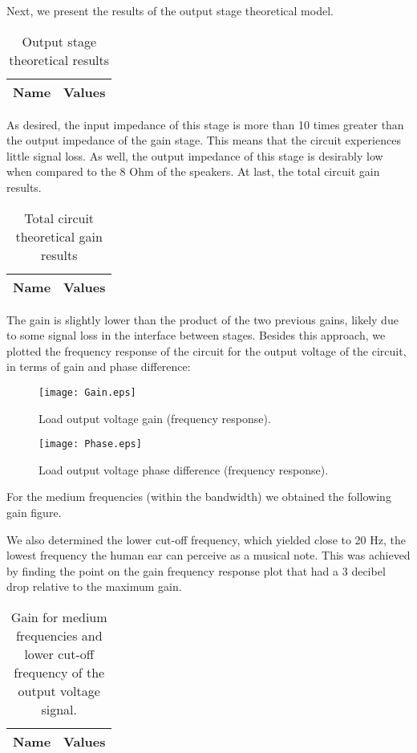 Next, we present the results of the output stage theoretical model.
\begin{table}[h]
  \centering
  \begin{tabular}{|l|r|}
    \hline    
    {\bf Name} & {\bf Values} \\ \hline
     
  \end{tabular}
  \caption{Output stage theoretical results}
  \label{tab:output}
\end{table}
\pagebreak

As desired, the input impedance of this stage is more than 10 times greater than the output impedance of the gain stage. This means that the circuit experiences little signal loss. As well, the output impedance of this stage is desirably low when compared to the 8 Ohm of the speakers.
At last, the total circuit gain results.

\begin{table}[h]
  \centering
  \begin{tabular}{|l|r|}
    \hline    
    {\bf Name} & {\bf Values} \\ \hline
     
  \end{tabular}
  \caption{Total circuit theoretical gain results}
  \label{tab:output}
\end{table}
The gain is slightly lower than the product of the two previous gains, likely due to some signal loss in the interface between stages.
Besides this approach, we plotted the frequency response of the circuit for the output voltage of the circuit, in terms of gain and phase difference:

\begin{figure}[!h] \centering
\texttt{[image: Gain.eps]}
\caption{Load output voltage gain (frequency response).}
\label{fig:gainfreq}
\end{figure}

\begin{figure}[!h] \centering
\texttt{[image: Phase.eps]}
\caption{Load output voltage phase difference (frequency response).}
\label{fig:phasefreq}
\end{figure}

\pagebreak

For the medium frequencies (within the bandwidth) we obtained the following gain figure.

We also determined the lower cut-off frequency, which yielded close to 20 Hz, the lowest frequency the human ear can perceive as a musical note. This was achieved by finding the point on the gain frequency response plot that had a 3 decibel drop relative to the maximum gain.
\begin{table}[h]
  \centering
  \begin{tabular}{|l|r|}
    \hline    
    {\bf Name} & {\bf Values} \\ \hline
     
  \end{tabular}
  \caption{Gain for medium frequencies and lower cut-off frequency of the output voltage signal.}
  \label{tab:freq}
\end{table}
